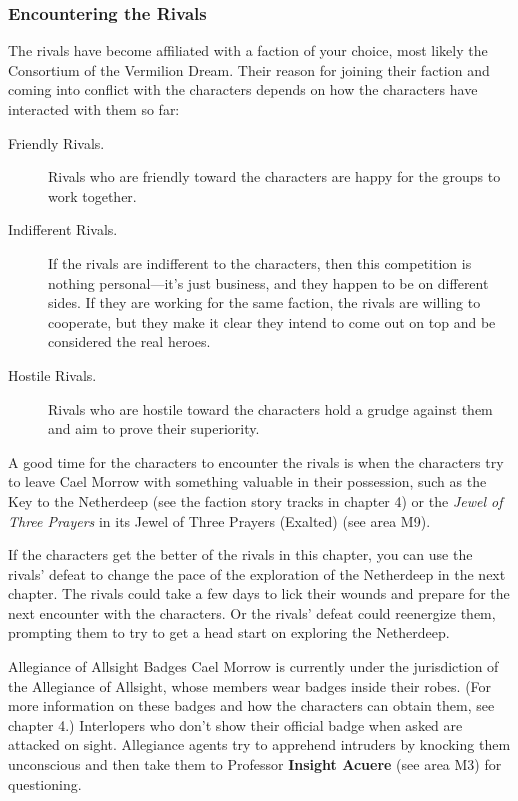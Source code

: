 \documentclass[10pt,a4paper,twoside,bg=print,twocolumn,openany,nodeprecatedcode]{dndbook}
\begin{document}
\subsubsection{Encountering the Rivals}
The rivals have become affiliated with a faction of your choice, most likely the Consortium of the Vermilion Dream. Their reason for joining their faction and coming into conflict with the characters depends on how the characters have interacted with them so far:


\begin{description}
\item[Friendly Rivals.]
Rivals who are friendly toward the characters are happy for the groups to work together.
\item[Indifferent Rivals.]
If the rivals are indifferent to the characters, then this competition is nothing personal—it's just business, and they happen to be on different sides. If they are working for the same faction, the rivals are willing to cooperate, but they make it clear they intend to come out on top and be considered the real heroes.
\item[Hostile Rivals.]
Rivals who are hostile toward the characters hold a grudge against them and aim to prove their superiority.
\end{description}

A good time for the characters to encounter the rivals is when the characters try to leave Cael Morrow with something valuable in their possession, such as the Key to the Netherdeep (see the faction story tracks in chapter 4) or the \textit{Jewel of Three Prayers} in its Jewel of Three Prayers (Exalted) (see area M9).

If the characters get the better of the rivals in this chapter, you can use the rivals' defeat to change the pace of the exploration of the Netherdeep in the next chapter. The rivals could take a few days to lick their wounds and prepare for the next encounter with the characters. Or the rivals' defeat could reenergize them, prompting them to try to get a head start on exploring the Netherdeep.

\begin{DndSidebar}[float=!b]{Allegiance of Allsight Badges}
Cael Morrow is currently under the jurisdiction of the Allegiance of Allsight, whose members wear badges inside their robes. (For more information on these badges and how the characters can obtain them, see chapter 4.) Interlopers who don't show their official badge when asked are attacked on sight. Allegiance agents try to apprehend intruders by knocking them unconscious and then take them to Professor \textbf{Insight Acuere} (see area M3) for questioning.



\end{DndSidebar}
\end{document}
